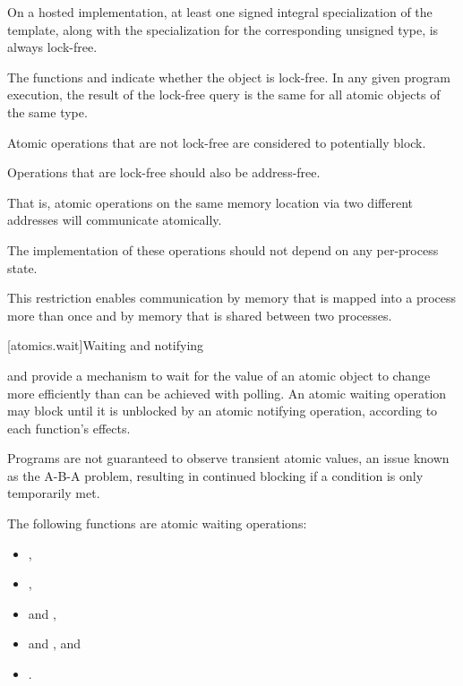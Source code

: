 \pnum
On a hosted implementation,
at least one signed integral specialization of the  template,
along with the specialization
for the corresponding unsigned type,
is always lock-free.

\pnum
The functions  and
indicate whether the object is lock-free. In any given program execution, the
result of the lock-free query
is the same for all atomic objects of the same type.

\pnum
Atomic operations that are not lock-free are considered to potentially
block.

\pnum
\recommended
Operations that are lock-free should also be address-free.
\begin{footnote}
That is,
atomic operations on the same memory location via two different addresses will
communicate atomically.
\end{footnote}
The implementation of these operations should not depend on any per-process state.
\begin{note}
This restriction enables communication by memory that is
mapped into a process more than once and by memory that is shared between two
processes.
\end{note}

[atomics.wait]{Waiting and notifying}

\pnum
{}
and 
provide a mechanism to wait for the value of an atomic object to change
more efficiently than can be achieved with polling.
An atomic waiting operation may block until it is unblocked
by an atomic notifying operation, according to each function's effects.
\begin{note}
Programs are not guaranteed to observe transient atomic values,
an issue known as the A-B-A problem,
resulting in continued blocking if a condition is only temporarily met.
\end{note}

\pnum
\begin{note}
The following functions are atomic waiting operations:
\begin{itemize}
\item {},
\item {},
\item {} and ,
\item {} and , and
\item {}.
\end{itemize}
\end{note}


